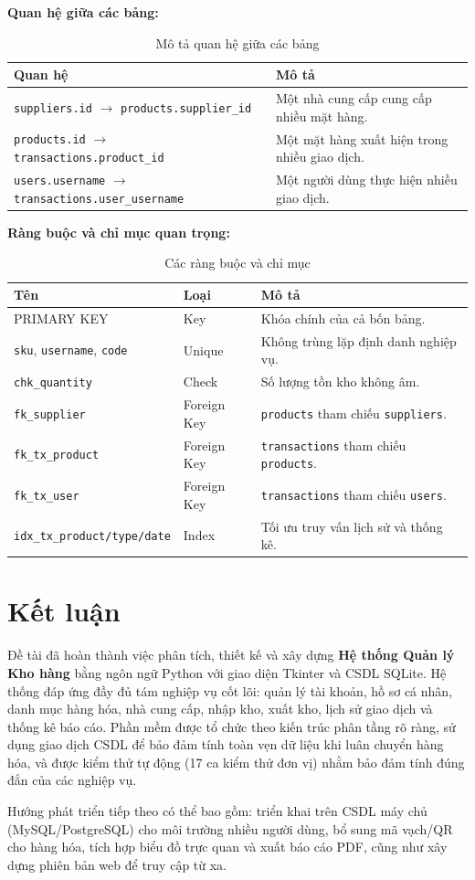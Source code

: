 \documentclass[12pt,a4paper]{report}
\begin{document}
\noindent\textbf{Quan hệ giữa các bảng:}
\begin{table}[H]
\centering
\renewcommand{\arraystretch}{1.2}
\begin{tabularx}{\textwidth}{|L{6cm}|X|}
\hline
\textbf{Quan hệ} & \textbf{Mô tả} \\ \hline
\texttt{suppliers.id} $\rightarrow$ \texttt{products.supplier\_id} & Một nhà cung cấp cung cấp nhiều mặt hàng. \\ \hline
\texttt{products.id} $\rightarrow$ \texttt{transactions.product\_id} & Một mặt hàng xuất hiện trong nhiều giao dịch. \\ \hline
\texttt{users.username} $\rightarrow$ \texttt{transactions.user\_username} & Một người dùng thực hiện nhiều giao dịch. \\ \hline
\end{tabularx}
\caption{Mô tả quan hệ giữa các bảng}
\end{table}

\noindent\textbf{Ràng buộc và chỉ mục quan trọng:}
\begin{table}[H]
\centering
\renewcommand{\arraystretch}{1.2}
\begin{tabularx}{\textwidth}{|L{4.2cm}|L{2.4cm}|X|}
\hline
\textbf{Tên} & \textbf{Loại} & \textbf{Mô tả} \\ \hline
PRIMARY KEY & Key & Khóa chính của cả bốn bảng. \\ \hline
\texttt{sku}, \texttt{username}, \texttt{code} & Unique & Không trùng lặp định danh nghiệp vụ. \\ \hline
\texttt{chk\_quantity} & Check & Số lượng tồn kho không âm. \\ \hline
\texttt{fk\_supplier} & Foreign Key & \texttt{products} tham chiếu \texttt{suppliers}. \\ \hline
\texttt{fk\_tx\_product} & Foreign Key & \texttt{transactions} tham chiếu \texttt{products}. \\ \hline
\texttt{fk\_tx\_user} & Foreign Key & \texttt{transactions} tham chiếu \texttt{users}. \\ \hline
\texttt{idx\_tx\_product/type/date} & Index & Tối ưu truy vấn lịch sử và thống kê. \\ \hline
\end{tabularx}
\caption{Các ràng buộc và chỉ mục}
\end{table}

\section*{Kết luận}
Đề tài đã hoàn thành việc phân tích, thiết kế và xây dựng \textbf{Hệ thống Quản
lý Kho hàng} bằng ngôn ngữ Python với giao diện Tkinter và CSDL SQLite. Hệ thống
đáp ứng đầy đủ tám nghiệp vụ cốt lõi: quản lý tài khoản, hồ sơ cá nhân, danh mục
hàng hóa, nhà cung cấp, nhập kho, xuất kho, lịch sử giao dịch và thống kê báo
cáo. Phần mềm được tổ chức theo kiến trúc phân tầng rõ ràng, sử dụng giao dịch
CSDL để bảo đảm tính toàn vẹn dữ liệu khi luân chuyển hàng hóa, và được kiểm thử
tự động (17 ca kiểm thử đơn vị) nhằm bảo đảm tính đúng đắn của các nghiệp vụ.

Hướng phát triển tiếp theo có thể bao gồm: triển khai trên CSDL máy chủ
(MySQL/PostgreSQL) cho môi trường nhiều người dùng, bổ sung mã vạch/QR cho hàng
hóa, tích hợp biểu đồ trực quan và xuất báo cáo PDF, cũng như xây dựng phiên bản
web để truy cập từ xa.
\end{document}
